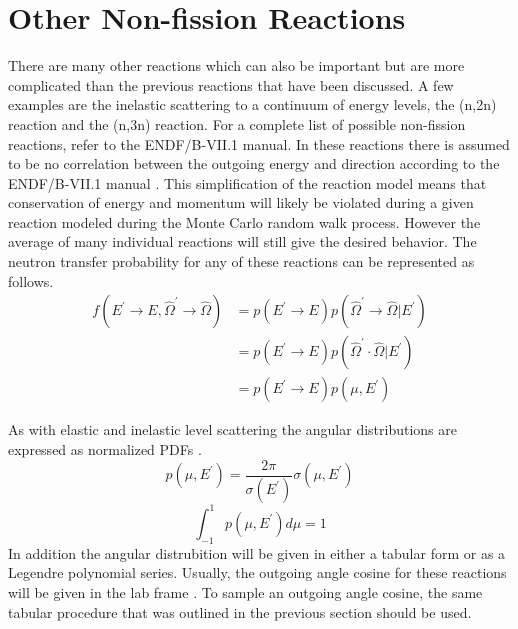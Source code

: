 \section{Other Non-fission Reactions}
There are many other reactions which can also be important but are more
complicated than the previous reactions that have been discussed. A few 
examples are the inelastic scattering to a continuum of energy levels, the 
(n,2n) reaction and the (n,3n) reaction. For a complete list of possible
non-fission reactions, refer to the ENDF/B-VII.1 manual. In these reactions 
there is assumed to be no correlation between the outgoing energy and direction 
according to the ENDF/B-VII.1 manual \citep{chadwick_endf/b-vii.1_2011}. This 
simplification of the reaction model means that conservation of energy and 
momentum will likely be violated during a given reaction modeled during the
Monte Carlo random walk process. However the average of many individual 
reactions will still give the desired behavior. The neutron transfer 
probability for any of these reactions can be represented as follows.
\begin{align}
  f(E^{'} \to E,\hat{\Omega}^{'} \to \hat{\Omega}) & = p(E^{'} \to E)
  p(\hat{\Omega}^{'} \to \hat{\Omega} | E^{'}) \nonumber \\
  & = p(E^{'} \to E)p(\hat{\Omega}^{'}\cdot\hat{\Omega} | E^{'}) \nonumber \\
  & = p(E^{'} \to E)p(\mu,E^{'})
\end{align}

As with elastic and inelastic level scattering the angular distributions are
expressed as normalized PDFs 
\citep{chadwick_endf/b-vii.1_2011}. 
\begin{equation*}
  p(\mu,E^{'}) = \frac{2\pi}{\sigma(E^{'})}\sigma(\mu,E^{'})
\end{equation*}
\begin{equation*}
  \int_{-1}^1p(\mu,E^{'})d\mu = 1
\end{equation*}
In addition the angular distrubition will be given in either a tabular form or
as a Legendre polynomial series. Usually, the outgoing angle cosine for these
reactions will be given in the lab frame \citep{chadwick_endf/b-vii.1_2011}. To
sample an outgoing angle cosine, the same tabular procedure that was outlined 
in the previous section should be used. 

